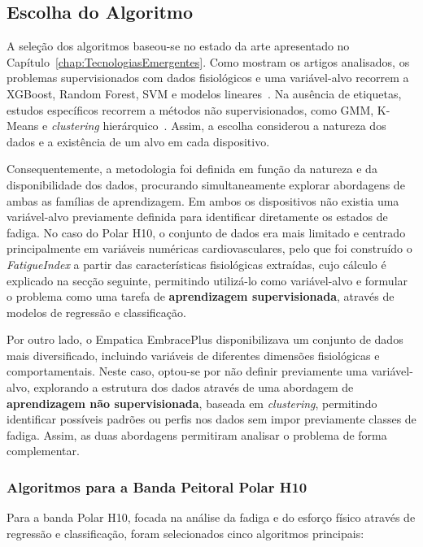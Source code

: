 \subsection{Escolha do Algoritmo}

A seleção dos algoritmos baseou-se no estado da arte apresentado no Capítulo~\ref{chap:TecnologiasEmergentes}. Como mostram os artigos analisados, os problemas supervisionados com dados fisiológicos e uma variável-alvo recorrem a XGBoost, Random Forest, SVM e modelos lineares~\cite{thomas2025,goutham2025,albarran2025}. Na ausência de etiquetas, estudos específicos recorrem a métodos não supervisionados, como GMM, K-Means e \textit{clustering} hierárquico~\cite{georgiev2026,georgieva2025}. Assim, a escolha considerou a natureza dos dados e a existência de um alvo em cada dispositivo.

Consequentemente, a metodologia foi definida em função da natureza e da disponibilidade dos dados, procurando simultaneamente explorar abordagens de ambas as famílias de aprendizagem. Em ambos os dispositivos não existia uma variável-alvo previamente definida para identificar diretamente os estados de fadiga. No caso do Polar H10, o conjunto de dados era mais limitado e centrado principalmente em variáveis numéricas cardiovasculares, pelo que foi construído o \textit{FatigueIndex} a partir das características fisiológicas extraídas, cujo cálculo é explicado na secção seguinte, permitindo utilizá-lo como variável-alvo e formular o problema como uma tarefa de \textbf{aprendizagem supervisionada}, através de modelos de regressão e classificação.

Por outro lado, o Empatica EmbracePlus disponibilizava um conjunto de dados mais diversificado, incluindo variáveis de diferentes dimensões fisiológicas e comportamentais. Neste caso, optou-se por não definir previamente uma variável-alvo, explorando a estrutura dos dados através de uma abordagem de \textbf{aprendizagem não supervisionada}, baseada em \textit{clustering}, permitindo identificar possíveis padrões ou perfis nos dados sem impor previamente classes de fadiga. Assim, as duas abordagens permitiram analisar o problema de forma complementar.

\subsubsection*{Algoritmos para a Banda Peitoral Polar H10}

Para a banda Polar H10, focada na análise da fadiga e do esforço físico através de regressão e classificação, foram selecionados cinco algoritmos principais:

